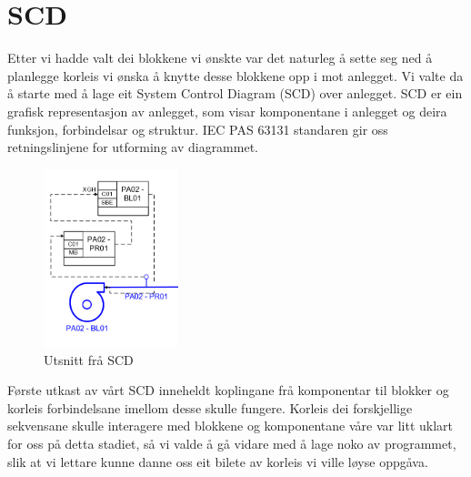 \section{SCD}
\thispagestyle{fancy}

Etter vi hadde valt dei blokkene vi ønskte var det naturleg å sette seg ned å planlegge korleis vi ønska å knytte desse blokkene opp i mot anlegget. 
Vi valte da å starte med å lage eit System Control Diagram (SCD) over anlegget. 
SCD er ein grafisk representasjon av anlegget, som visar komponentane i anlegget og deira funksjon, forbindelsar og struktur. 
IEC PAS 63131 standaren gir oss retningslinjene for utforming av diagrammet.


\begin{figure}[htbp]
    \centering
    \includegraphics[width=0.35\textwidth]{Bilder/Visio_eksempel.png}
    \caption{Utsnitt frå SCD}\label{fig:SCD eksempel}    
\end{figure}


Første utkast av vårt SCD inneheldt koplingane frå komponentar til blokker og korleis forbindelsane imellom desse skulle fungere. 
Korleis dei forskjellige sekvensane skulle interagere med blokkene og komponentane våre var litt uklart for oss på detta stadiet,
så vi valde å gå vidare med å lage noko av programmet, slik at vi lettare kunne danne oss eit bilete av korleis vi ville løyse oppgåva.


\newpage